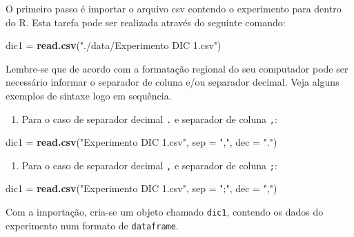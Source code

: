 \documentclass[
]{article}
\newenvironment{Shaded}{\begin{snugshade}}{\end{snugshade}}
\newcommand{\DataTypeTok}[1]{\textcolor[rgb]{0.13,0.29,0.53}{#1}}
\newcommand{\KeywordTok}[1]{\textcolor[rgb]{0.13,0.29,0.53}{\textbf{#1}}}
\newcommand{\NormalTok}[1]{#1}
\newcommand{\StringTok}[1]{\textcolor[rgb]{0.31,0.60,0.02}{#1}}
\providecommand{\tightlist}{%
  \setlength{\itemsep}{0pt}\setlength{\parskip}{0pt}}
\begin{document}
O primeiro passo é importar o arquivo csv contendo o experimento para dentro do R. Esta tarefa pode ser realizada através do seguinte comando:

\begin{Shaded}
\begin{Highlighting}[]
\NormalTok{dic1 =}\StringTok{ }\KeywordTok{read.csv}\NormalTok{(}\StringTok{"./data/Experimento DIC 1.csv"}\NormalTok{)}
\end{Highlighting}
\end{Shaded}

Lembre-se que de acordo com a formatação regional do seu computador pode ser necessário informar o separador de coluna e/ou separador decimal. Veja alguns exemplos de sintaxe logo em sequência.

\begin{enumerate}
\def\labelenumi{\arabic{enumi}.}
\tightlist
\item
  Para o caso de separador decimal \texttt{.} e separador de coluna \texttt{,}:
\end{enumerate}

\begin{Shaded}
\begin{Highlighting}[]
\NormalTok{dic1 =}\StringTok{ }\KeywordTok{read.csv}\NormalTok{(}\StringTok{"Experimento DIC 1.csv"}\NormalTok{, }\DataTypeTok{sep =} \StringTok{","}\NormalTok{, }\DataTypeTok{dec =} \StringTok{"."}\NormalTok{)}
\end{Highlighting}
\end{Shaded}

\begin{enumerate}
\def\labelenumi{\arabic{enumi}.}
\setcounter{enumi}{1}
\tightlist
\item
  Para o caso de separador decimal \texttt{,} e separador de coluna \texttt{;}:
\end{enumerate}

\begin{Shaded}
\begin{Highlighting}[]
\NormalTok{dic1 =}\StringTok{ }\KeywordTok{read.csv}\NormalTok{(}\StringTok{"Experimento DIC 1.csv"}\NormalTok{, }\DataTypeTok{sep =} \StringTok{";"}\NormalTok{, }\DataTypeTok{dec =} \StringTok{","}\NormalTok{)}
\end{Highlighting}
\end{Shaded}

Com a importação, cria-se um objeto chamado \texttt{dic1}, contendo os dados do experimento num formato de \texttt{dataframe}.
\end{document}
